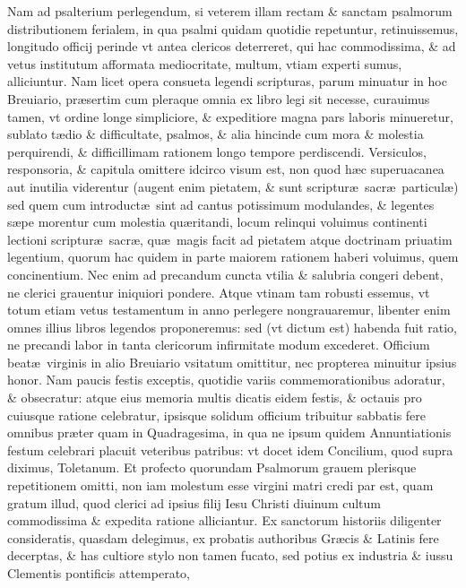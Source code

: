 \documentclass[a5paper,10pt]{book}
\def\ae{æ}
\begin{document}
Nam ad psalterium perlegendum, si veterem illam rectam \& sanctam psalmorum distributionem ferialem, in qua psalmi quidam quotidie repetuntur, retinuissemus, longitudo officij perinde vt antea clericos deterreret, qui hac commodissima, \& ad vetus institutum afformata mediocritate, multum, vtiam experti sumus, alliciuntur.
Nam licet opera consueta legendi scripturas, parum minuatur in hoc Breuiario, pr\ae sertim cum pleraque omnia ex libro legi sit necesse, curauimus tamen, vt ordine longe simpliciore, \& expeditiore magna 
pars laboris minueretur, sublato t\ae dio \& difficultate, psalmos, \& alia hincinde cum mora \& molestia perquirendi, \& difficillimam rationem longo tempore perdiscendi.
Versiculos, responsoria, \& capitula omittere idcirco visum est, non quod h\ae c superuacanea aut inutilia viderentur (augent enim pietatem, \& sunt scriptur\ae \ sacr\ae \ particul\ae ) sed quem %
cum introduct\ae \ sint ad cantus potissimum modulandes, \& legentes s\ae pe morentur cum molestia qu\ae ritandi, locum relinqui voluimus continenti lectioni scriptur\ae \ sacr\ae , qu\ae \ magis facit ad pietatem atque doctrinam priuatim legentium, quorum hac quidem in parte maiorem rationem haberi voluimus, quem %
concinentium.
Nec enim ad precandum cuncta vtilia \& salubria congeri debent, ne clerici grauentur iniquiori pondere.
Atque vtinam tam robusti essemus, vt totum etiam vetus testamentum in anno perlegere nongrauaremur, libenter enim omnes %
illius libros legendos proponeremus:
sed (vt dictum est) habenda fuit ratio, ne precandi labor in tanta clericorum infirmitate modum excederet.
Officium beat\ae \ virginis in alio Breuiario vsitatum omittitur, nec propterea minuitur ipsius honor.
Nam paucis festis exceptis, quotidie variis commemorationibus adoratur, \& obsecratur:
atque eius memoria multis dicatis eidem festis, \& octauis pro cuiusque ratione celebratur, ipsisque solidum officium tribuitur sabbatis fere omnibus pr\ae ter quam %
in Quadragesima, in qua ne ipsum quidem Annuntiationis festum celebrari placuit veteribus patribus:
vt docet idem Concilium, quod supra diximus, Toletanum.
Et profecto quorundam Psalmorum grauem plerisque repetitionem omitti, non iam molestum esse virgini matri credi par est, quam %
gratum illud, quod clerici ad ipsius filij Iesu Christi diuinum cultum commodissima \& expedita ratione alliciantur.
Ex sanctorum %
historiis diligenter consideratis, quasdam delegimus, ex probatis authoribus Gr\ae cis \& Latinis fere decerptas, \& has cultiore stylo non tamen fucato, sed potius ex industria \& iussu Clementis pontificis attemperato, %
\end{document}
